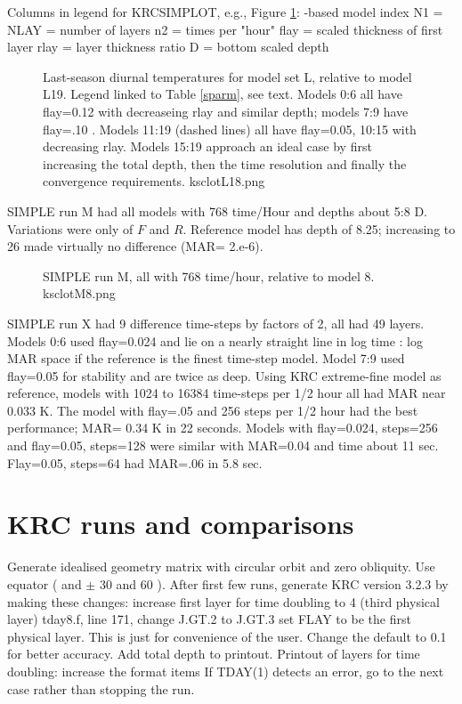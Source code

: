 \documentclass{article}
\begin{document}
Columns in legend for KRCSIMPLOT, e.g., Figure \ref{ksclotL18}: 
-based model index
\qi N1 = NLAY = number of layers
\qi n2 = times per "hour" 
\qi flay = scaled thickness of first layer
\qi rlay = layer thickness ratio
\qi D = bottom scaled depth


\begin{figure}[!ht] 
\caption[Deltas for set L]{ Last-season diurnal temperatures for model set L,
  relative to model L19. Legend linked to Table \ref{sparm}, see text. Models 0:6
  all have flay=0.12 with decreaseing rlay and similar depth; models 7:9 have
  flay=.10 . Models 11:19 (dashed lines) all have flay=0.05, 10:15 with
  decreasing rlay. Models 15:19 approach an ideal case by first increasing the
  total depth, then the time resolution and finally the convergence
  requirements.
\label{ksclotL18} ksclotL18.png }
\end{figure} 

SIMPLE run M had all models with 768 time/Hour and depths about 5:8 D. Variations were only of $F$ and $R$. Reference model has depth of 8.25; increasing to 26 made virtually no difference (MAR= 2.e-6).

\begin{figure}[!ht] 
\caption[SIMPLE run M]{SIMPLE run M, all with 768 time/hour, relative to model 8.  
\label{ksclotM8}  ksclotM8.png }
\end{figure} 

SIMPLE run X had 9 difference time-steps by factors of 2, all had 49
layers. Models 0:6 used flay=0.024 and lie on a nearly straight line in log time
: log MAR space if the reference is the finest time-step model. Model 7:9 used
flay=0.05 for stability and are twice as deep.  Using KRC extreme-fine model as
reference, models with 1024 to 16384 time-steps per 1/2 hour all had MAR near
0.033 K. The model with flay=.05 and 256 steps per 1/2 hour had the best
performance; MAR= 0.34 K in 22 seconds.  Models with flay=0.024, steps=256 and
flay=0.05, steps=128 were similar with MAR=0.04 and time about 11
sec. Flay=0.05, steps=64 had MAR=.06 in 5.8 sec.

\clearpage

\section{KRC runs and comparisons} %
Generate idealised geometry matrix with circular orbit and zero obliquity. Use equator ( and $\pm$ 30 and 60 \qd ). After first few runs, generate KRC version 3.2.3 by making these changes:
\qi increase first layer for time doubling to 4 (third physical layer)
\qiii tday8.f, line 171, change J.GT.2 to J.GT.3
\qi set FLAY to be the first physical layer. This is just for convenience of the user.  
\qii Change the default to 0.1 for better accuracy.
\qi Add total depth to printout.
\qi Printout of layers for time doubling: increase the format items
\qi If TDAY(1) detects an error, go to the next case rather than stopping the run.
\end{document}
